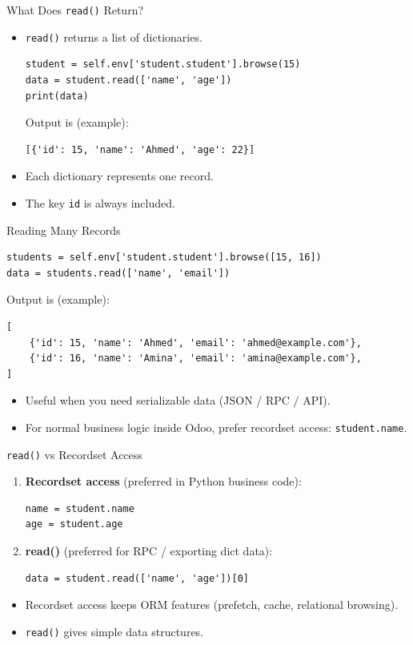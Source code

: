 \begin{frame}[fragile]{What Does \texttt{read()} Return?}
	\begin{block}{}
		\begin{itemize}
			\item \texttt{read()} returns a list of dictionaries.
\begin{lstlisting}
student = self.env['student.student'].browse(15)
data = student.read(['name', 'age'])
print(data)
\end{lstlisting}
			Output is (example):
\begin{lstlisting}
[{'id': 15, 'name': 'Ahmed', 'age': 22}]
\end{lstlisting}
			\item Each dictionary represents one record.
			\item The key \texttt{id} is always included.
		\end{itemize}
	\end{block}
\end{frame}

\begin{frame}[fragile]{Reading Many Records}
\begin{lstlisting}
students = self.env['student.student'].browse([15, 16])
data = students.read(['name', 'email'])
\end{lstlisting}
	Output is (example):
\begin{lstlisting}
[
	{'id': 15, 'name': 'Ahmed', 'email': 'ahmed@example.com'},
	{'id': 16, 'name': 'Amina', 'email': 'amina@example.com'},
]
\end{lstlisting}
	\begin{itemize}
		\item Useful when you need serializable data (JSON / RPC / API).
		\item For normal business logic inside Odoo, prefer recordset access: \texttt{student.name}.
	\end{itemize}
\end{frame}

\begin{frame}[fragile]{\texttt{read()} vs Recordset Access}
	\begin{enumerate}
		\item \textbf{Recordset access} (preferred in Python business code):
\begin{lstlisting}
name = student.name
age = student.age
\end{lstlisting}
		\item \textbf{read()} (preferred for RPC / exporting dict data):
\begin{lstlisting}
data = student.read(['name', 'age'])[0]
\end{lstlisting}
	\end{enumerate}
	\begin{itemize}
		\item Recordset access keeps ORM features (prefetch, cache, relational browsing).
		\item \texttt{read()} gives simple data structures.
	\end{itemize}
\end{frame}

